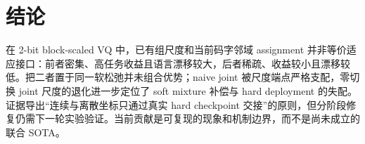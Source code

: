 \section{结论}
在 2-bit block-scaled VQ 中，已有组尺度和当前码字邻域 assignment 并非等价适应接口：前者密集、高任务收益且语言漂移较大，后者稀疏、收益较小且漂移较低。把二者置于同一软松弛并未组合优势；naive joint 被尺度端点严格支配，零切换 joint 尺度的退化进一步定位了 soft mixture 补偿与 hard deployment 的失配。证据导出“连续与离散坐标只通过真实 hard checkpoint 交接”的原则，但分阶段修复仍需下一轮实验验证。当前贡献是可复现的现象和机制边界，而不是尚未成立的联合 SOTA。
